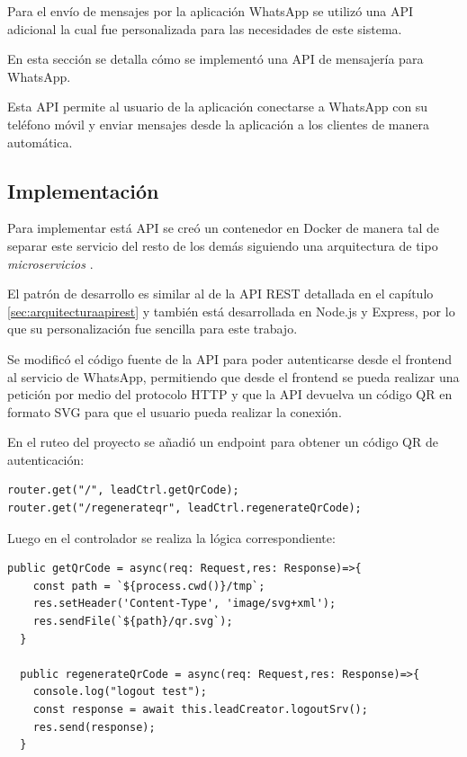 Para el envío de mensajes por la aplicación WhatsApp \cite{whatsapp} se utilizó una API adicional \cite{api-whatsapp-ts} la cual fue personalizada para las necesidades de este sistema.

En esta sección se detalla cómo se implementó una API de mensajería para WhatsApp.

Esta API permite al usuario de la aplicación conectarse a WhatsApp con su teléfono móvil y enviar mensajes desde la aplicación a los clientes de manera automática.

\subsection{Implementación}
\label{subsec:apimessengerimplementación}

Para implementar está API se creó un contenedor en Docker de manera tal de separar este servicio del resto de los demás siguiendo una arquitectura de tipo \textit{microservicios} \cite{microservices-docs}.

El patrón de desarrollo es similar al de la API REST detallada en el capítulo \ref{sec:arquitecturaapirest} y también está desarrollada en Node.js y Express, por lo que su personalización fue sencilla para este trabajo.

Se modificó el código fuente de la API para poder autenticarse desde el frontend al servicio de WhatsApp, permitiendo que desde el frontend se pueda realizar una petición por medio del protocolo HTTP y que la API devuelva un código QR \cite{qr-code} en formato SVG \cite{svg-format} para que el usuario pueda realizar la conexión. 

En el ruteo del proyecto se añadió un endpoint para obtener un código QR de autenticación:

\begin{lstlisting}[label=cod:apimessengerroute,caption=Endpoint para obtener código QR.]
router.get("/", leadCtrl.getQrCode);
router.get("/regenerateqr", leadCtrl.regenerateQrCode);
\end{lstlisting}

Luego en el controlador se realiza la lógica correspondiente:

\begin{lstlisting}[label=cod:apimessengercontroller,caption=Controlador de ruta para obtener código QR.]
  public getQrCode = async(req: Request,res: Response)=>{
    const path = `${process.cwd()}/tmp`;
    res.setHeader('Content-Type', 'image/svg+xml');
    res.sendFile(`${path}/qr.svg`);
  }

  public regenerateQrCode = async(req: Request,res: Response)=>{
    console.log("logout test");
    const response = await this.leadCreator.logoutSrv();
    res.send(response);
  }
\end{lstlisting}

